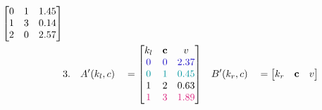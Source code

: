 \begin{figure}[H]
\begin{alignat*}{5}
\begin{bmatrix}
                                                               0   & 1 & 1.45 \\
                                                               1   & 3 & 0.14 \\
                                                               2   & 0 & 2.57 \\
                                                           \end{bmatrix}
        \\
         & 3.          &              & A'(k_l, c)     &                                                                                      & = \begin{bmatrix}
                                                                                                                                                      k_l                      & \textbf{c}               & v                           \\
                                                                                                                                                      \color{blind-blue}0      & \color{blind-blue}0      & \color{blind-blue}2.37      \\
                                                                                                                                                      \color{blind-turquoise}0 & \color{blind-turquoise}1 & \color{blind-turquoise}0.45 \\
                                                                                                                                                      1                        & 2                        & 0.63                        \\
                                                                                                                                                      \color{blind-purple}1    & \color{blind-purple}3    & \color{blind-purple}1.89    \\
                                                                                                                                                  \end{bmatrix}
         &             & B'(k_r, c)   &                & = \begin{bmatrix}
                                                               k_r                      & \textbf{c}               & v                           \\

\end{bmatrix}
\end{alignat*}
\end{figure}
